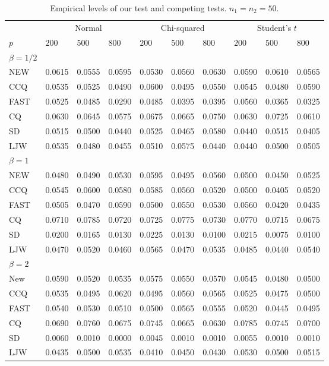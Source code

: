 \documentclass[3p]{elsarticle}
\theoremstyle{plain}
\theoremstyle{definition}
\theoremstyle{remark}
\begin{document}
\begin{table}[ht]
\caption{Empirical levels of our test and competing tests. $n_1=n_2=50$.} 
\label{hahaha1}
\vspace{3mm}
\centering
\begin{tabular}{llllllllll}
\toprule
    &   \multicolumn{3}{c}{Normal} & \multicolumn{3}{c}{Chi-squared}& \multicolumn{3}{c}{Student's $t$}  \\
    \cmidrule(r){2-4}
\cmidrule(r){5-7}
\cmidrule(r){8-10}
    $p$ & $200$ &  $500$ & $800$ & $200$  & $500$ & $800$ & $200$ & $500$ & $800$ \\ 
\midrule
    $\beta=1/2$\\
NEW & 0.0615 & 0.0555 & 0.0595 & 0.0530 & 0.0560 & 0.0630 & 0.0590 & 0.0610 & 0.0565 \\ 
CCQ & 0.0535 & 0.0525 & 0.0490 & 0.0600 & 0.0495 & 0.0550 & 0.0545 & 0.0480 & 0.0590 \\ 
FAST & 0.0525 & 0.0485 & 0.0290 & 0.0485 & 0.0395 & 0.0395 & 0.0560 & 0.0365 & 0.0325 \\ 
CQ & 0.0630 & 0.0645 & 0.0575 & 0.0675 & 0.0665 & 0.0750 & 0.0630 & 0.0725 & 0.0610 \\ 
SD & 0.0515 & 0.0500 & 0.0440 & 0.0525 & 0.0465 & 0.0580 & 0.0440 & 0.0515 & 0.0405 \\ 
LJW & 0.0535 & 0.0480 & 0.0455 & 0.0510 & 0.0575 & 0.0440 & 0.0440 & 0.0500 & 0.0505 \\ 
    $\beta=1$\\
NEW & 0.0480 & 0.0490 & 0.0530 & 0.0595 & 0.0495 & 0.0560 & 0.0500 & 0.0450 & 0.0525 \\ 
CCQ & 0.0545 & 0.0600 & 0.0580 & 0.0585 & 0.0560 & 0.0520 & 0.0500 & 0.0405 & 0.0520 \\ 
FAST & 0.0505 & 0.0470 & 0.0590 & 0.0500 & 0.0550 & 0.0530 & 0.0560 & 0.0420 & 0.0435 \\ 
CQ & 0.0710 & 0.0785 & 0.0720 & 0.0725 & 0.0775 & 0.0730 & 0.0770 & 0.0715 & 0.0675 \\ 
SD & 0.0200 & 0.0165 & 0.0130 & 0.0225 & 0.0130 & 0.0100 & 0.0215 & 0.0075 & 0.0100 \\ 
LJW & 0.0470 & 0.0520 & 0.0460 & 0.0565 & 0.0470 & 0.0535 & 0.0485 & 0.0440 & 0.0540 \\ 
    $\beta=2$\\
New & 0.0590 & 0.0520 & 0.0535 & 0.0575 & 0.0550 & 0.0570 & 0.0545 & 0.0480 & 0.0500 \\ 
CCQ & 0.0535 & 0.0495 & 0.0620 & 0.0495 & 0.0560 & 0.0565 & 0.0525 & 0.0475 & 0.0500 \\ 
FAST & 0.0540 & 0.0530 & 0.0510 & 0.0500 & 0.0565 & 0.0555 & 0.0520 & 0.0445 & 0.0495 \\ 
CQ & 0.0690 & 0.0760 & 0.0675 & 0.0745 & 0.0665 & 0.0630 & 0.0785 & 0.0745 & 0.0700 \\ 
SD & 0.0060 & 0.0010 & 0.0000 & 0.0045 & 0.0010 & 0.0010 & 0.0055 & 0.0010 & 0.0010 \\ 
LJW & 0.0435 & 0.0500 & 0.0535 & 0.0410 & 0.0450 & 0.0430 & 0.0530 & 0.0500 & 0.0515 \\ 
\bottomrule
\end{tabular}
\end{table}
\end{document}
